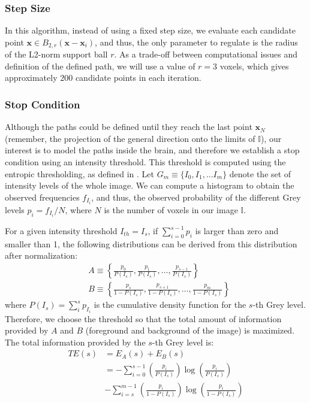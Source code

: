 \subsubsection{Step Size}
In this algorithm, instead of using a fixed step size, we evaluate each candidate point $\mathbf{x} \in B_{2,r}(\mathbf{x}-\mathbf{x}_i)$, and thus, the only parameter to regulate is the radius of the L2-norm support ball $r$. As a trade-off between computational issues and definition of the defined path, we will use a value of $r=3$ voxels, which gives approximately $200$ candidate points in each iteration. 

\subsubsection{Stop Condition}
Although the paths could be defined until they reach the last point $\mathbf{x}_N$ (remember, the projection of the general direction onto the limits of $\mathbb{I}$), our interest is to model the paths inside the brain, and therefore we establish a stop condition using an intensity threshold. This threshold is computed using the entropic thresholding, as defined in \cite{Yen1995}. Let $G_m \equiv \{I_0, I_1, ... I_m\} $ denote the set of intensity levels of the whole image. We can compute a histogram to obtain the observed frequencies $f_{I_i}$, and thus, the observed probability of the different Grey levels $p_{i} = f_{I_i}/N$, where $N$ is the number of voxels in our image $\mathbb{I}$.

For a given intensity threshold $I_{th}=I_s$, if $\sum_{i=0}^{s-1}p_i$ is larger than zero and smaller than 1, the following distributions can be derived from this distribution after normalization:
\begin{align}
& A \equiv \left\{\frac{p_0}{P(I_{s})}, \frac{p_1}{P(I_{s})}, \dots, \frac{p_{s-1}}{P(I_{s})} \right\}\\
& B \equiv \left\{\frac{p_{s}}{1-P(I_{s})}, \frac{p_{s+1}}{1-P(I_{s})}, \dots, \frac{p_m}{1-P(I_{s})} \right\}
\end{align}
where $P(I_s) = \sum_{i}^{s}p_{I_i}$ is the cumulative density function for the $s$-th Grey level. Therefore, we choose the threshold so that the total amount of information provided by $A$ and $B$ (foreground and background of the image) is maximized. The total information provided by the $s$-th Grey level is: 
\begin{align}
TE(s) & = E_A(s) + E_B(s) \\
& = -\sum_{i=0}^{s-1}\left(\frac{p_i}{P(I_s)}\right)\log\left(\frac{p_i}{P(I_s)}\right) \\
& - \sum_{i=s}^{m-1}\left(\frac{p_i}{1-P(I_s)}\right)\log\left(\frac{p_i}{1-P(I_s)}\right)
\end{align}

